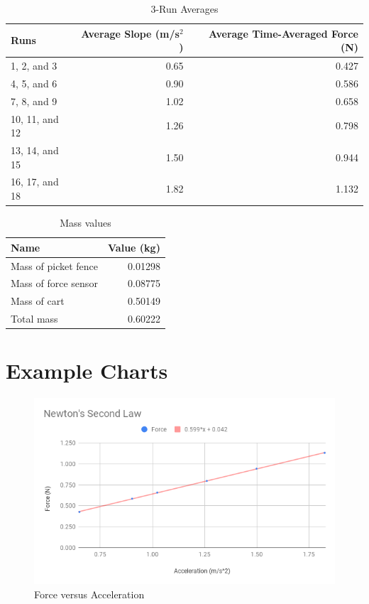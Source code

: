 %
\begin{table}[ht]
    \centering
    \begin{tabular}{l|r|r}
        \textbf{Runs} & \textbf{Average Slope} (m/s$^{2}$) & \textbf{Average Time-Averaged Force} (N) \\
        \hline
        1, 2, and 3 & 0.65 & 0.427 \\
        4, 5, and 6 & 0.90 & 0.586 \\
        7, 8, and 9 & 1.02 & 0.658 \\
        10, 11, and 12 & 1.26 & 0.798 \\
        13, 14, and 15 & 1.50 & 0.944 \\
        16, 17, and 18 & 1.82 & 1.132 \\
        \hline
    \end{tabular}
    \caption{3-Run Averages}
    \label{table:04.averages}
\end{table}
%
\newpage
\begin{table}[ht]
    \centering
    \begin{tabular}{l|r}
        \textbf{Name} & \textbf{Value} (kg) \\
        \hline
        Mass of picket fence & 0.01298 \\
        Mass of force sensor & 0.08775 \\
        Mass of cart & 0.50149 \\
        \hline
        Total mass & 0.60222 \\
        \hline
    \end{tabular}
    \caption{Mass values}
    \label{table:04.masses}
\end{table}
%
\FloatBarrier
\newpage
\section{Example Charts}
%
\begin{figure}[ht]
    \centering
    \includegraphics[scale=0.71]{image/04-second-law/newton-2nd-law.png}
    \caption{Force versus Acceleration}
    \label{figure:04.fma}
\end{figure}